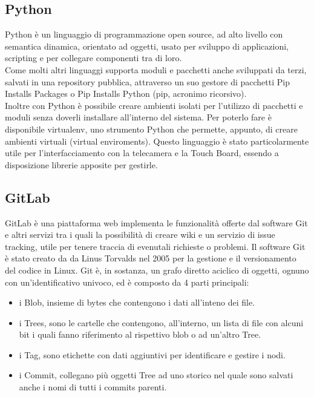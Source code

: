 \subsection{Python}
Python \`e un linguaggio di programmazione open source, ad alto livello con semantica dinamica, orientato ad oggetti, usato
per sviluppo di applicazioni, scripting e per collegare componenti tra di loro.\\[1\baselineskip]
Come molti altri linguaggi supporta moduli e pacchetti anche sviluppati da terzi, salvati in una repository pubblica,
attraverso un suo gestore di pacchetti Pip Installs Packages o Pip Installs Python (pip, acronimo ricorsivo).
\\[1\baselineskip]
Inoltre con Python \`e possibile creare ambienti isolati per l'utilizzo di pacchetti e moduli senza doverli installare all'interno del sistema.
Per poterlo fare \`e disponibile virtualenv, uno strumento Python che permette, appunto, di creare ambienti virtuali (virtual enviroments).
Questo linguaggio \`e stato particolarmente utile per l'interfacciamento con la telecamera e la Touch Board, essendo a disposizione librerie
apposite per gestirle.
\\[2\baselineskip]

\subsection{GitLab}
GitLab \`e una piattaforma web implementa le funzionalit\`a offerte dal software Git e altri
servizi tra i quali la possibilit\`a di creare wiki e un servizio di issue tracking, utile per tenere traccia
di evenutali richieste o problemi.
Il software Git \`e stato creato da da Linus Torvalds nel 2005 per la gestione e il versionamento del codice in Linux.
Git \`e, in sostanza, un grafo diretto aciclico di oggetti, ognuno con un'identificativo univoco, ed \`e composto da 4 parti principali:
\begin{itemize}
\item i Blob, insieme di bytes che contengono i dati all'inteno dei file.
\item i Trees, sono le cartelle che contengono, all'interno, un lista di file con alcuni bit i quali fanno riferimento al
rispettivo blob o ad un'altro Tree.
\item i Tag, sono etichette con dati aggiuntivi per identificare e gestire i nodi.
\item i Commit, collegano pi\`u oggetti Tree ad uno storico nel quale sono salvati anche i nomi di tutti i commits parenti.
\end{itemize}
